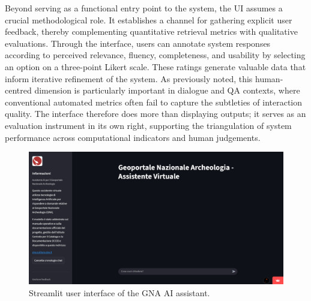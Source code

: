 \begin{spacing}{1.5}
Beyond serving as a functional entry point to the system, the UI assumes a crucial methodological role. It establishes a channel for gathering explicit user feedback, thereby complementing quantitative retrieval metrics with qualitative evaluations. Through the interface, users can annotate system responses according to perceived relevance, fluency, completeness, and usability by selecting an option on a three-point Likert scale. These ratings generate valuable data that inform iterative refinement of the system. As previously noted, this human-centred dimension is particularly important in dialogue and QA contexts, where conventional automated metrics often fail to capture the subtleties of interaction quality. The interface therefore does more than displaying outputs; it serves as an evaluation instrument in its own right, supporting the triangulation of system performance across computational indicators and human judgements.

\vspace{0.8em}
\begin{figure}[H]
  \centering
  \includegraphics[width=\textwidth]{images/UI_full.png} 
  \caption{Streamlit user interface of the GNA AI assistant.}
  \label{fig:UI}
\end{figure}


\end{spacing}
